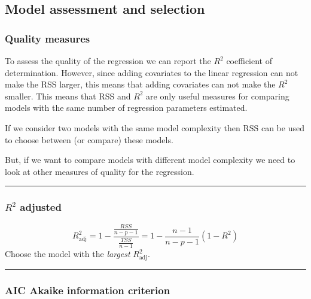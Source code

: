 \documentclass[]{article}
\begin{document}
\hypertarget{model-assessment-and-selection}{%
\subsection{Model assessment and
selection}\label{model-assessment-and-selection}}

\hypertarget{quality-measures}{%
\subsubsection{Quality measures}\label{quality-measures}}

To assess the quality of the regression we can report the \(R^2\)
coefficient of determination. However, since adding covariates to the
linear regression can not make the RSS larger, this means that adding
covariates can not make the \(R^2\) smaller. This means that RSS and
\(R^2\) are only useful measures for comparing models with the same
number of regression parameters estimated.

If we consider two models with the same model complexity then RSS can be
used to choose between (or compare) these models.

But, if we want to compare models with different model complexity we
need to look at other measures of quality for the regression.

\begin{center}\rule{0.5\linewidth}{\linethickness}\end{center}

\hypertarget{r2-adjusted}{%
\subsubsection{\texorpdfstring{\(R^2\)
adjusted}{R\^{}2 adjusted}}\label{r2-adjusted}}

\[R^2_{\text{adj}}=1-\frac{\frac{RSS}{n-p-1}}{\frac{TSS}{n-1}}=1-\frac{n-1}{n-p-1}(1-R^2)\]
Choose the model with the \emph{largest} \(R^2_{\text{adj}}\).

\begin{center}\rule{0.5\linewidth}{\linethickness}\end{center}

\hypertarget{aic-akaike-information-criterion}{%
\subsubsection{AIC Akaike information
criterion}\label{aic-akaike-information-criterion}}
\end{document}

